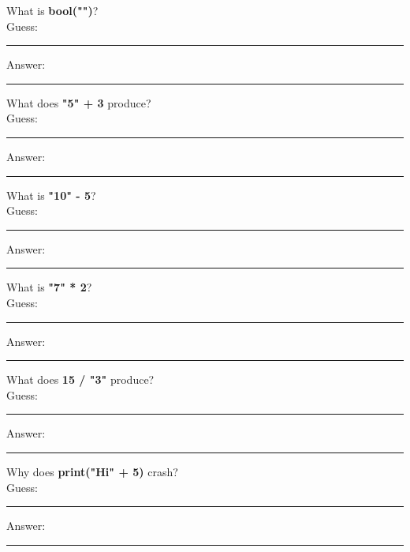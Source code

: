 \documentclass{article}
\begin{document}
\begin{tasks}[
    style=enumerate,
    label-format=\bfseries,
    label-width=1.5em,
    item-indent=2em,
    column-sep=1em,
    after-item-skip=2em
  ]
        \task What is \textbf{bool("")}?  \\
        Guess:  \vspace{3mm}\\
        \rule{\linewidth}{0.4pt} %
        Answer:  \vspace{3mm}\\
        \rule{\linewidth}{0.4pt} %

        \task What does \textbf{"5" + 3} produce? \\ 
        Guess:  \vspace{3mm}\\
        \rule{\linewidth}{0.4pt} %
        Answer:  \vspace{3mm}\\
        \rule{\linewidth}{0.4pt} %

        \task What is \textbf{"10" - 5}? \\ 
        Guess:  \vspace{3mm}\\
        \rule{\linewidth}{0.4pt} %
        Answer:  \vspace{3mm}\\
        \rule{\linewidth}{0.4pt} %

        \task What is \textbf{"7" * 2}?  \\
        Guess:  \vspace{3mm}\\
        \rule{\linewidth}{0.4pt} %
        Answer:  \vspace{3mm}\\
        \rule{\linewidth}{0.4pt} %

        \task What does \textbf{15 / "3"} produce? \\ 
        Guess:  \vspace{3mm}\\
        \rule{\linewidth}{0.4pt} %
        Answer:  \vspace{3mm}\\
        \rule{\linewidth}{0.4pt} %

        \task Why does \textbf{print("Hi" + 5)} crash?  \\
        Guess:  \vspace{3mm}\\
        \rule{\linewidth}{0.4pt} %
        Answer:  \vspace{3mm}\\
        \rule{\linewidth}{0.4pt} %



\end{tasks}
\end{document}
